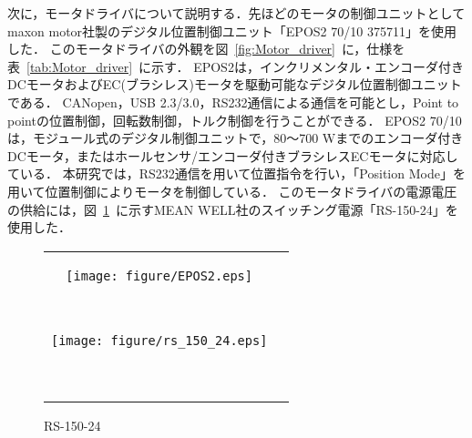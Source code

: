 \documentclass[a4paper,12pt]{article_vdlab_sotsuron}
\begin{document}
\newpage

次に，モータドライバについて説明する．先ほどのモータの制御ユニットとしてmaxon motor社製のデジタル位置制御ユニット「EPOS2 70/10 375711」を使用した．
このモータドライバの外観を図~\ref{fig:Motor_driver}~に，仕様を表~\ref{tab:Motor_driver}~に示す．
EPOS2は，インクリメンタル・エンコーダ付きDCモータおよびEC(ブラシレス)モータを駆動可能なデジタル位置制御ユニットである．
CANopen，USB 2.3/3.0，RS232通信による通信を可能とし，Point to pointの位置制御，回転数制御，トルク制御を行うことができる．
EPOS2 70/10は，モジュール式のデジタル制御ユニットで，80〜700 Wまでのエンコーダ付きDCモータ，またはホールセンサ/エンコーダ付きブラシレスECモータに対応している．
本研究では，RS232通信を用いて位置指令を行い，「Position Mode」を用いて位置制御によりモータを制御している．
このモータドライバの電源電圧の供給には，図~\ref{fig:rs_150_24}~に示すMEAN WELL社のスイッチング電源「RS-150-24」を使用した．

\vspace{10mm}
\begin{figure}[h]
    \begin{tabular}{cc}
      \begin{minipage}{0.5\hsize}
	\centering
	  \texttt{[image: figure/EPOS2.eps]}
	  \begin{center}
	  \vspace{2mm}
	  \caption{EPOS2 70/10 375711}\
	  \label{fig:Motor_driver}
	  \end{center}
	\end{minipage}
       \begin{minipage}{0.45\hsize}
	\centering
	  \texttt{[image: figure/rs\_150\_24.eps]}
	  \begin{center}
	  \vspace{2mm}
	  \caption{RS-150-24}\
	  \label{fig:rs_150_24}
	  \end{center}
      \end{minipage}
    \end{tabular}
    \vspace{2mm}
\end{figure}
\end{document}
